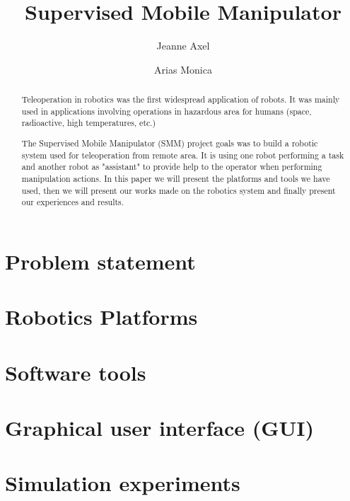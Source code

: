 \documentclass[11pt,a4paper,twocolumn]{article}
\begin{document}
\pagestyle{plain}
\author{Jeanne Axel \and Arias Monica}
\title{Supervised Mobile Manipulator}
\maketitle
\begin{abstract}
Teleoperation in robotics was the first widespread application of robots. 
It was mainly used in applications involving operations in hazardous area for humans (space, 
radioactive, high temperatures, etc.)

The Supervised Mobile Manipulator (SMM) project goals was to build a robotic system used for
teleoperation from remote area. It is using one robot performing a task and another robot as 
"assistant" to provide help to the operator when performing manipulation actions.
In this paper we will present the platforms and tools we have used, then we will present our
works made on the robotics system and finally present our experiences and results.
\end{abstract}
\section{Problem statement}
\section{Robotics Platforms}
\section{Software tools}
\section{Graphical user interface (GUI)}
\section{Simulation experiments}
\end{document}
